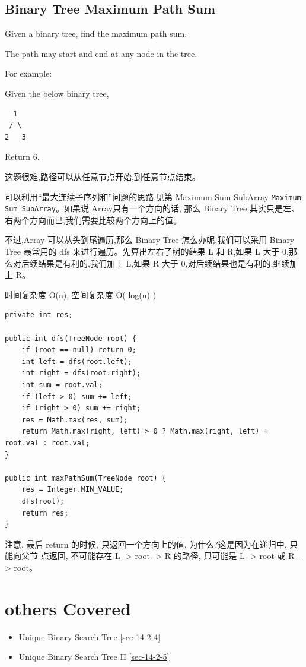 \documentclass[12pt]{book}
\begin{document}
\subsection{Binary Tree Maximum Path Sum}
\label{sec-4-5-9}
Given a binary tree, find the maximum path sum.

The path may start and end at any node in the tree.

For example:

Given the below binary tree,
\lstset{language=java,label= ,caption= ,numbers=none}
\begin{lstlisting}
  1
 / \
2   3
\end{lstlisting}

Return 6.

这题很难,路径可以从任意节点开始,到任意节点结束。

可以利用“最大连续子序列和”问题的思路,见第 Maximum Sum SubArray \texttt{Maximum Sum SubArray}。如果说 Array只有一个方向的话, 那么 Binary Tree 其实只是左、右两个方向而已,我们需要比较两个方向上的值。

不过,Array 可以从头到尾遍历,那么 Binary Tree 怎么办呢,我们可以采用 Binary Tree 最常用的 dfs 来进行遍历。先算出左右子树的结果 L 和 R,如果 L 大于 0,那么对后续结果是有利的,我们加上 L,如果 R 大于 0,对后续结果也是有利的,继续加上 R。

时间复杂度 O(n), 空间复杂度 O( log(n) )

\lstset{language=java,label= ,caption= ,numbers=none}
\begin{lstlisting}
private int res;

public int dfs(TreeNode root) {
    if (root == null) return 0;
    int left = dfs(root.left);
    int right = dfs(root.right);
    int sum = root.val;
    if (left > 0) sum += left;
    if (right > 0) sum += right;
    res = Math.max(res, sum);
    return Math.max(right, left) > 0 ? Math.max(right, left) + root.val : root.val;
}

public int maxPathSum(TreeNode root) {
    res = Integer.MIN_VALUE;
    dfs(root);
    return res;
}
\end{lstlisting}

注意, 最后 return 的时候, 只返回一个方向上的值, 为什么?这是因为在递归中, 只能向父节
点返回, 不可能存在 L -> root -> R 的路径, 只可能是 L -> root 或 R -> root。

\section{others Covered}
\label{sec-4-6}
\begin{itemize}
\item Unique Binary Search Tree
\ref{sec-14-2-4}
\item Unique Binary Search Tree II
\ref{sec-14-2-5}
\end{itemize}
\end{document}
